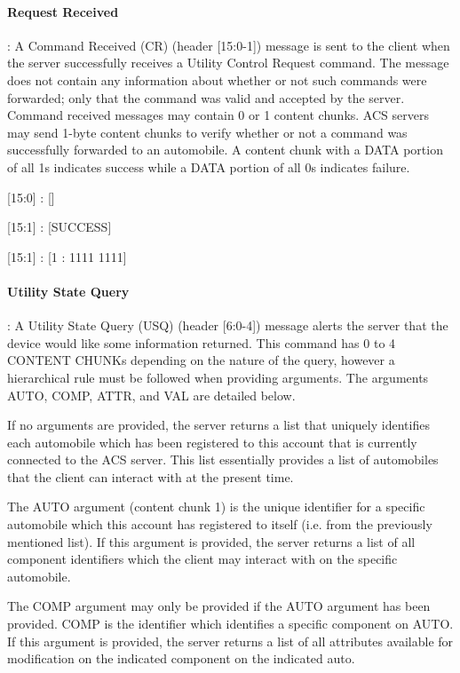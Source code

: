 \paragraph{Request Received}: A Command Received (CR) (header [15:0-1]) message is sent to the client when the server successfully receives a Utility Control Request command. The message does not contain any information
about whether or not such commands were forwarded; only that the command was valid and accepted by the server. Command received messages may contain 0 or 1 content chunks. ACS servers may send 1-byte content chunks to verify whether or not a command was successfully forwarded to an automobile. A content chunk with a DATA portion of all 1s indicates success while a DATA portion of all 0s indicates failure.

\begin{center}
{\textsf{[15:0] : []}}

{\textsf{[15:1] : [SUCCESS]}}

{\textsf{[15:1] : [1 : 1111 1111]}}
\end{center}

\paragraph{Utility State Query}: A Utility State Query (USQ) (header [6:0-4]) message alerts the server that the device would like some information returned. This command has 0 to 4 CONTENT CHUNKs depending on the nature of the query, however a hierarchical rule must be followed when providing arguments. The arguments AUTO, COMP, ATTR, and VAL are detailed below.

If no arguments are provided, the server returns a list that uniquely identifies each automobile which has been registered to this account that is currently connected to the ACS server.  This list essentially provides a list of automobiles that the client can interact with at the present time.

The AUTO argument (content chunk 1) is the unique identifier for a specific automobile which this account has registered to itself (i.e. from the previously mentioned list). If this argument is provided, the server returns a list of all component identifiers which the client may interact with on the specific automobile.

The COMP argument may only be provided if the AUTO argument has been provided. COMP is the identifier which identifies a specific component on AUTO. If this argument is provided, the server returns a list of all attributes available for modification on the indicated component on the indicated auto.

